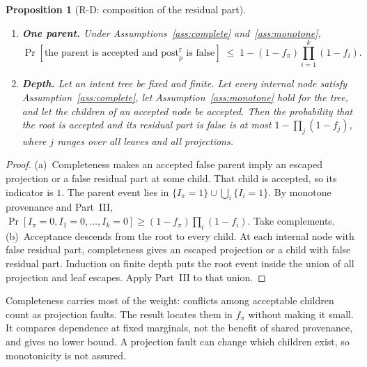 \documentclass[11pt]{article}
\newtheorem{proposition}{Proposition}
\theoremstyle{definition}
\theoremstyle{remark}
\newcommand{\postr}{\mathrm{post}^{\mathrm{r}}}
\begin{document}
\begin{proposition}[R-D: composition of the residual part]\label{prop:rd}
\leavevmode
\begin{enumerate}[label=\textup{(\alph*)},leftmargin=2em,itemsep=3pt]
\item \textbf{One parent.} Under Assumptions~\ref{ass:complete} and~\ref{ass:monotone},
\[
\Pr[\text{the parent is accepted and }\postr_p\text{ is false}]
\;\le\;1-(1-f_\pi)\prod_{i=1}^{k}(1-f_i).
\]
\item \textbf{Depth.} Let an intent tree be fixed and finite. Let every internal node satisfy
Assumption~\ref{ass:complete}, let Assumption~\ref{ass:monotone} hold for the tree, and let the
children of an accepted node be accepted. Then the probability that the root is accepted and its
residual part is false is at most $1-\prod_{j}(1-f_j)$, where $j$ ranges over all leaves and all
projections.
\end{enumerate}
\end{proposition}
\begin{proof}
(a)~Completeness makes an accepted false parent imply an escaped projection or a false residual
part at some child. That child is accepted, so its indicator is $1$.
The parent event lies in $\{I_\pi=1\}\cup\bigcup_i\{I_i=1\}$.
By monotone provenance and Part~III,
$\Pr[I_\pi=0,I_1=0,\ldots,I_k=0]\ge(1-f_\pi)\prod_i(1-f_i)$.
Take complements.
(b)~Acceptance descends from the root to every child.
At each internal node with false residual part, completeness gives an escaped projection or
a child with false residual part. Induction on finite depth puts the root event inside the union
of all projection and leaf escapes. Apply Part~III to that union.
\end{proof}
Completeness carries most of the weight: conflicts among acceptable children count as projection
faults. The result locates them in $f_\pi$ without making it small.
It compares dependence at fixed marginals, not the benefit of shared provenance, and gives no
lower bound. A projection fault can change which children exist, so monotonicity is not assured.
\end{document}
